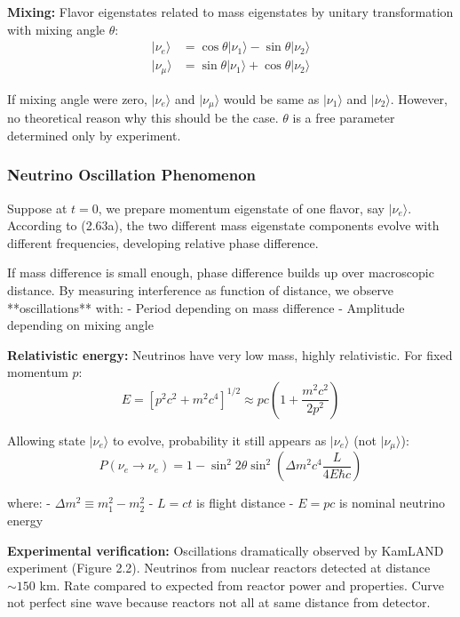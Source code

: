 \documentclass[11pt,a4paper]{article}
\begin{document}
\textbf{Mixing:} Flavor eigenstates related to mass eigenstates by unitary transformation with mixing angle $\theta$:
\begin{align}
|\nu_e\rangle &= \cos\theta|\nu_1\rangle - \sin\theta|\nu_2\rangle \tag{2.63a} \\
|\nu_\mu\rangle &= \sin\theta|\nu_1\rangle + \cos\theta|\nu_2\rangle \tag{2.63b}
\end{align}

If mixing angle were zero, $|\nu_e\rangle$ and $|\nu_\mu\rangle$ would be same as $|\nu_1\rangle$ and $|\nu_2\rangle$. However, no theoretical reason why this should be the case. $\theta$ is a free parameter determined only by experiment.

\subsubsection{Neutrino Oscillation Phenomenon}

Suppose at $t = 0$, we prepare momentum eigenstate of one flavor, say $|\nu_e\rangle$. According to (2.63a), the two different mass eigenstate components evolve with different frequencies, developing relative phase difference.

If mass difference is small enough, phase difference builds up over macroscopic distance. By measuring interference as function of distance, we observe **oscillations** with:
- Period depending on mass difference
- Amplitude depending on mixing angle

\textbf{Relativistic energy:} Neutrinos have very low mass, highly relativistic. For fixed momentum $p$:
\begin{equation}
E = [p^2c^2 + m^2c^4]^{1/2} \approx pc\left(1 + \frac{m^2c^2}{2p^2}\right)
\tag{2.64}
\end{equation}

Allowing state $|\nu_e\rangle$ to evolve, probability it still appears as $|\nu_e\rangle$ (not $|\nu_\mu\rangle$):
\begin{equation}
\boxed{P(\nu_e \to \nu_e) = 1 - \sin^2 2\theta \sin^2\left(\Delta m^2 c^4 \frac{L}{4E\hbar c}\right)}
\tag{2.65}
\end{equation}

where:
- $\Delta m^2 \equiv m_1^2 - m_2^2$
- $L = ct$ is flight distance
- $E = pc$ is nominal neutrino energy

\textbf{Experimental verification:} Oscillations dramatically observed by KamLAND experiment (Figure 2.2). Neutrinos from nuclear reactors detected at distance $\sim 150$ km. Rate compared to expected from reactor power and properties. Curve not perfect sine wave because reactors not all at same distance from detector.
\end{document}
